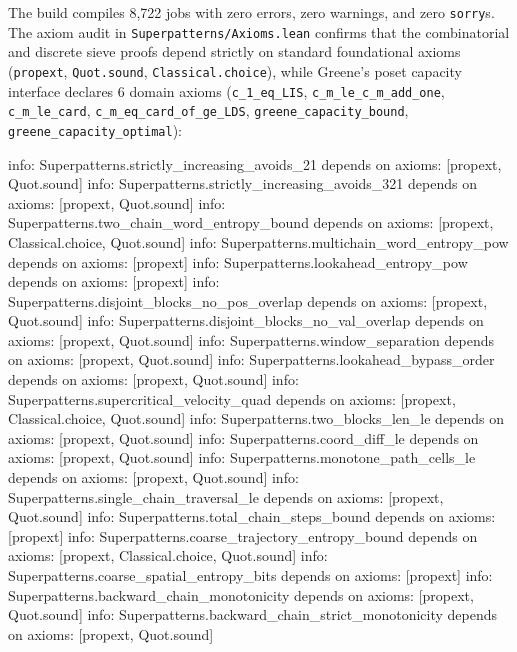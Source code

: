 \documentclass[
  11pt,
]{article}
\newenvironment{Shaded}{}{}
\newcommand{\NormalTok}[1]{#1}
\begin{document}
The build compiles 8,722 jobs with zero errors, zero warnings, and zero \texttt{sorry}s.
The axiom audit in \texttt{Superpatterns/Axioms.lean} confirms that the
combinatorial and discrete sieve proofs depend strictly on standard
foundational axioms (\texttt{propext}, \texttt{Quot.sound}, \texttt{Classical.choice}), while Greene's poset capacity interface declares 6 domain axioms (\texttt{c\_1\_eq\_LIS}, \texttt{c\_m\_le\_c\_m\_add\_one}, \texttt{c\_m\_le\_card}, \texttt{c\_m\_eq\_card\_of\_ge\_LDS}, \texttt{greene\_capacity\_bound}, \texttt{greene\_capacity\_optimal}):

\begin{Shaded}
\begin{Highlighting}[]
\NormalTok{info: Superpatterns.strictly\_increasing\_avoids\_21 depends on axioms: [propext, Quot.sound]}
\NormalTok{info: Superpatterns.strictly\_increasing\_avoids\_321 depends on axioms: [propext, Quot.sound]}
\NormalTok{info: Superpatterns.two\_chain\_word\_entropy\_bound depends on axioms: [propext, Classical.choice, Quot.sound]}
\NormalTok{info: Superpatterns.multichain\_word\_entropy\_pow depends on axioms: [propext]}
\NormalTok{info: Superpatterns.lookahead\_entropy\_pow depends on axioms: [propext]}
\NormalTok{info: Superpatterns.disjoint\_blocks\_no\_pos\_overlap depends on axioms: [propext, Quot.sound]}
\NormalTok{info: Superpatterns.disjoint\_blocks\_no\_val\_overlap depends on axioms: [propext, Quot.sound]}
\NormalTok{info: Superpatterns.window\_separation depends on axioms: [propext, Quot.sound]}
\NormalTok{info: Superpatterns.lookahead\_bypass\_order depends on axioms: [propext, Quot.sound]}
\NormalTok{info: Superpatterns.supercritical\_velocity\_quad depends on axioms: [propext, Classical.choice, Quot.sound]}
\NormalTok{info: Superpatterns.two\_blocks\_len\_le depends on axioms: [propext, Quot.sound]}
\NormalTok{info: Superpatterns.coord\_diff\_le depends on axioms: [propext, Quot.sound]}
\NormalTok{info: Superpatterns.monotone\_path\_cells\_le depends on axioms: [propext, Quot.sound]}
\NormalTok{info: Superpatterns.single\_chain\_traversal\_le depends on axioms: [propext, Quot.sound]}
\NormalTok{info: Superpatterns.total\_chain\_steps\_bound depends on axioms: [propext]}
\NormalTok{info: Superpatterns.coarse\_trajectory\_entropy\_bound depends on axioms: [propext, Classical.choice, Quot.sound]}
\NormalTok{info: Superpatterns.coarse\_spatial\_entropy\_bits depends on axioms: [propext]}
\NormalTok{info: Superpatterns.backward\_chain\_monotonicity depends on axioms: [propext, Quot.sound]}
\NormalTok{info: Superpatterns.backward\_chain\_strict\_monotonicity depends on axioms: [propext, Quot.sound]}

\end{Highlighting}
\end{Shaded}
\end{document}
